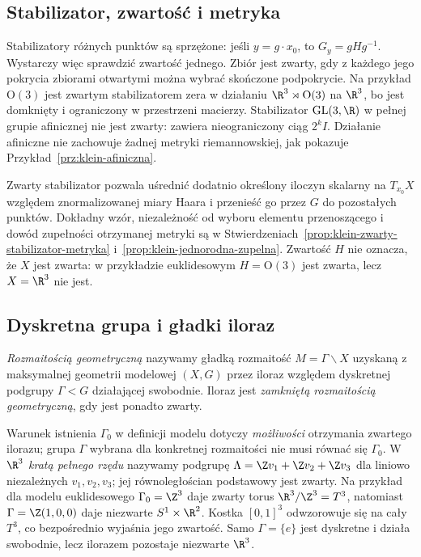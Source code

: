 \subsection*{Stabilizator, zwartość i metryka}

Stabilizatory różnych punktów są sprzężone: jeśli $y=g\cdot x_0$,
to $G_y=gHg^{-1}$. Wystarczy więc sprawdzić zwartość jednego.
Zbiór jest zwarty, gdy z każdego jego pokrycia zbiorami otwartymi
można wybrać skończone podpokrycie. Na przykład
$\mathrm O(3)$ jest zwartym stabilizatorem zera w działaniu
$\R^3\rtimes\mathrm O(3)$ na $\R^3$, bo jest domknięty i ograniczony
w przestrzeni macierzy. Stabilizator $\mathrm{GL}(3,\R)$ w pełnej
grupie afinicznej nie jest zwarty: zawiera nieograniczony ciąg
$2^k I$. Działanie afiniczne nie zachowuje żadnej metryki
riemannowskiej, jak pokazuje Przykład~\ref{prz:klein-afiniczna}.

Zwarty stabilizator pozwala uśrednić dodatnio określony iloczyn
skalarny na $T_{x_0}X$ względem znormalizowanej miary Haara
i przenieść go przez $G$ do pozostałych punktów. Dokładny wzór,
niezależność od wyboru elementu przenoszącego i dowód zupełności
otrzymanej metryki są w
Stwierdzeniach~\ref{prop:klein-zwarty-stabilizator-metryka}
i~\ref{prop:klein-jednorodna-zupelna}.
Zwartość $H$ nie oznacza, że $X$ jest zwarta: w przykładzie
euklidesowym $H=\mathrm O(3)$ jest zwarta, lecz $X=\R^3$ nie jest.

\subsection*{Dyskretna grupa i gładki iloraz}

\begin{definicja}
\label{def:thurston-rozmaitosc-geometryczna}
\emph{Rozmaitością geometryczną} nazywamy gładką rozmaitość
$M=\Gamma\backslash X$ uzyskaną z maksymalnej geometrii modelowej $(X,G)$
przez iloraz względem dyskretnej podgrupy $\Gamma<G$ działającej
swobodnie. Iloraz jest \emph{zamkniętą rozmaitością geometryczną},
gdy jest ponadto zwarty.
\end{definicja}

Warunek istnienia $\Gamma_0$ w definicji modelu dotyczy
\emph{możliwości} otrzymania zwartego ilorazu; grupa $\Gamma$
wybrana dla konkretnej rozmaitości nie musi równać się $\Gamma_0$.
W $\R^3$ \emph{kratą pełnego rzędu} nazywamy podgrupę
$\Lambda=\Z v_1+\Z v_2+\Z v_3$ dla liniowo niezależnych
$v_1,v_2,v_3$; jej równoległościan podstawowy jest zwarty.
Na przykład dla modelu euklidesowego $\Gamma_0=\Z^3$ daje
zwarty torus $\R^3/\Z^3=T^3$, natomiast
$\Gamma=\Z(1,0,0)$ daje niezwarte $S^1\times\R^2$.
Kostka $[0,1]^3$ odwzorowuje się na cały $T^3$, co bezpośrednio
wyjaśnia jego zwartość. Samo $\Gamma=\{e\}$ jest dyskretne
i działa swobodnie, lecz ilorazem pozostaje niezwarte $\R^3$.

